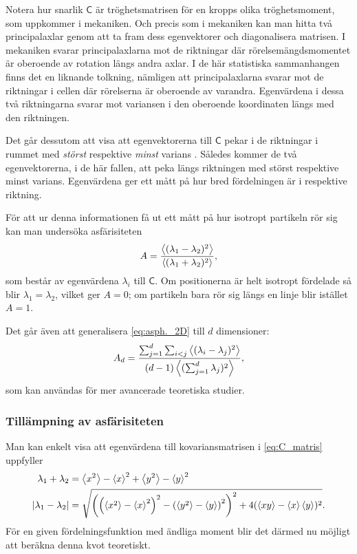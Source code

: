 Notera hur snarlik $\mathsf{C}$ är tröghetsmatrisen för en kropps olika tröghetsmoment, som uppkommer i mekaniken. Och precis som i mekaniken kan man hitta två principalaxlar genom att ta fram dess egenvektorer och diagonalisera matrisen. I mekaniken svarar principalaxlarna mot de riktningar där rörelsemängdsmomentet är oberoende av rotation längs andra axlar. I de här statistiska sammanhangen finns det en liknande tolkning, nämligen att principalaxlarna svarar mot de riktningar i cellen där rörelserna är oberoende av varandra. Egenvärdena i dessa två riktningarna svarar mot variansen i den oberoende koordinaten längs med den riktningen. 

Det går dessutom att visa att  egenvektorerna till $\mathsf{C}$ pekar i de riktningar i rummet med \emph{störst} respektive \emph{minst} varians \cite{Shlens_PCA2014}. Således kommer de två egenvektorerna, i de här fallen, att peka längs riktningen med störst respektive minst varians. Egenvärdena ger ett mått på hur bred fördelningen är i respektive riktning.


För att ur denna informationen få ut ett mått på hur isotropt partikeln rör sig kan man undersöka asfärisiteten~\cite{Rudnick_Asphericity1986}
\begin{equation}\label{eq:asph._2D}
    A=\frac{\ev{(\lambda_1 - \lambda_2)^2}}{\ev{(\lambda_1 + \lambda_2)^2}},
\end{equation}
som består av egenvärdena $\lambda_i$ till $\mathsf{C}$.
Om positionerna är helt isotropt fördelade så blir $\lambda_1=\lambda_2$, vilket ger $A=0$; om partikeln bara rör sig längs en linje blir istället $A=1$.

Det går även att generalisera \eqref{eq:asph._2D} till $d$ dimensioner:
\begin{equation}\label{eq:asph.}
    A_d=\frac{\sum_{j=1}^d\sum_{i<j} 
\ev{(\lambda_i-\lambda_j)^2} }{
(d-1) \ev{(\sum_{j=1}^d \lambda_j)^2}},
\end{equation}
som kan användas för mer avancerade teoretiska studier.


\subsubsection{Tillämpning av asfärisiteten}
Man kan enkelt visa att egenvärdena till kovariansmatrisen i \eqref{eq:C_matris} uppfyller~\cite{Hong_asymmetri1998}
\begin{equation}
\begin{aligned}
\lambda_1+\lambda_2 
&= \ev{x^2}-\ev{x}^2+\ev{y^2}-\ev{y}^2 
\\
\abs{\lambda_1-\lambda_2} 
&=\sqrt{\left(
            \left(\ev{x^2}-\ev{x}^2\right)^2
            -\left(\ev{y^2}-\ev{y}\right)^2
        \right)^2 
        +4(\ev{xy}-\ev{x}\ev{y})^2
}.
\end{aligned}
\end{equation}
För en given fördelningsfunktion med ändliga moment blir det därmed nu möjligt att beräkna denna kvot teoretiskt.

